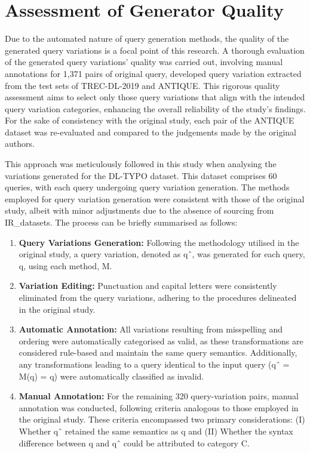 \section{Assessment of Generator Quality}
Due to the automated nature of query generation methods, the quality of the generated query variations is a focal point of this research. A thorough evaluation of the generated query variations' quality was carried out, involving manual annotations for 1,371 pairs of {original query, developed query variation} extracted from the test sets of TREC-DL-2019 and ANTIQUE. This rigorous quality assessment aims to select only those query variations that align with the intended query variation categories, enhancing the overall reliability of the study's findings. For the sake of consistency with the original study, each pair of the ANTIQUE dataset was re-evaluated and compared to the judgements made by the original authors.

This approach was meticulously followed in this study when analysing the variations generated for the DL-TYPO dataset. This dataset comprises 60 queries, with each query undergoing query variation generation. The methods employed for query variation generation were consistent with those of the original study, albeit with minor adjustments due to the absence of sourcing from IR\_datasets. The process can be briefly summarised as follows:

\begin{enumerate}
\item \textbf{Query Variations Generation:} Following the methodology utilised in the original study, a query variation, denoted as qˆ, was generated for each query, q, using each method, M.
\item \textbf{Variation Editing:} Punctuation and capital letters were consistently eliminated from the query variations, adhering to the procedures delineated in the original study.
\item \textbf{Automatic Annotation:} All variations resulting from misspelling and ordering were automatically categorised as valid, as these transformations are considered rule-based and maintain the same query semantics. Additionally, any transformations leading to a query identical to the input query (qˆ = M(q) = q) were automatically classified as invalid.
\item \textbf{Manual Annotation:} For the remaining 320 query-variation pairs, manual annotation was conducted, following criteria analogous to those employed in the original study. These criteria encompassed two primary considerations: (I) Whether qˆ retained the same semantics as q and (II) Whether the syntax difference between q and qˆ could be attributed to category C.
\end{enumerate}

